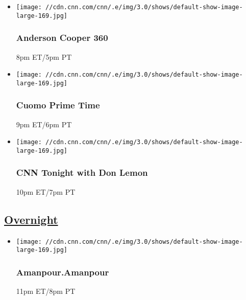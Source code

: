 \begin{itemize}
\item
  \texttt{[image: //cdn.cnn.com/cnn/.e/img/3.0/shows/default-show-image-large-169.jpg]}

  \hypertarget{anderson-cooper-360-4}{%
  \subsubsection{Anderson Cooper 360}\label{anderson-cooper-360-4}}

  8pm ET/5pm PT
\end{itemize}

\begin{itemize}
\item
  \texttt{[image: //cdn.cnn.com/cnn/.e/img/3.0/shows/default-show-image-large-169.jpg]}

  \hypertarget{cuomo-prime-time-4}{%
  \subsubsection{Cuomo Prime Time}\label{cuomo-prime-time-4}}

  9pm ET/6pm PT
\end{itemize}

\begin{itemize}
\item
  \texttt{[image: //cdn.cnn.com/cnn/.e/img/3.0/shows/default-show-image-large-169.jpg]}

  \hypertarget{cnn-tonight-with-don-lemon-4}{%
  \subsubsection{CNN Tonight with Don
  Lemon}\label{cnn-tonight-with-don-lemon-4}}

  10pm ET/7pm PT
\end{itemize}

\hypertarget{overnight--6}{%
\subsection{\texorpdfstring{\href{/tv/schedule/cnn/index.html}{Overnight}~}{Overnight~}}\label{overnight--6}}

\begin{itemize}
\item
  \texttt{[image: //cdn.cnn.com/cnn/.e/img/3.0/shows/default-show-image-large-169.jpg]}

  \hypertarget{amanpouramanpour--13}{%
  \subsubsection{Amanpour.Amanpour }\label{amanpouramanpour--13}}

  11pm ET/8pm PT
\end{itemize}


